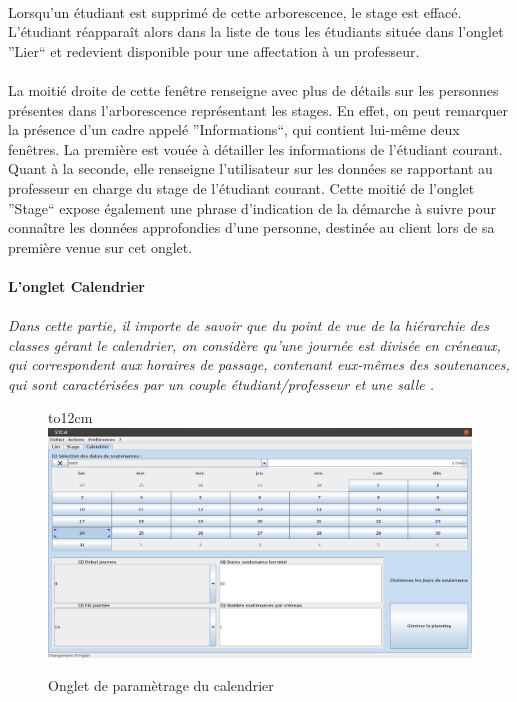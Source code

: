 \documentclass[a4paper,10pt]{report}
\begin{document}
	      \paragraph{}
		Lorsqu'un étudiant est supprimé de cette arborescence, le stage est effacé.
		L'étudiant réapparaît alors dans la liste de tous les étudiants située dans l'onglet ''Lier`` et redevient disponible pour une affectation à un professeur.
		
	      \paragraph{}
		La moitié droite de cette fenêtre renseigne avec plus de détails sur les personnes présentes dans l'arborescence représentant les stages.
		En effet, on peut remarquer la présence d'un cadre appelé ''Informations``, qui contient lui-même deux fenêtres.
		La première est vouée à détailler les informations de l'étudiant courant. 
		Quant à la seconde, elle renseigne l'utilisateur sur les données se rapportant au professeur en charge du stage de l'étudiant courant. 
		Cette moitié de l'onglet ''Stage`` expose également une phrase d'indication de la démarche à suivre pour connaître les données approfondies d'une personne, destinée au client lors de sa première venue sur cet onglet.
		
		\newpage
	    \paragraph{L'onglet Calendrier}
	      \paragraph{}
		\textit{Dans cette partie, il importe de savoir que du point de vue de la hiérarchie des classes gérant le calendrier, on considère qu'une journée est divisée en créneaux, qui correspondent aux horaires de passage, contenant eux-mêmes des soutenances, qui sont caractérisées par un couple étudiant/professeur et une salle	.} 
		
		\begin{figure}[!h]
		\hbox to12cm{\hss\includegraphics[width=18cm]{Calendrier.png}\hss}
		\caption{Onglet de paramètrage du calendrier}
		\end{figure}
		
\end{document}
